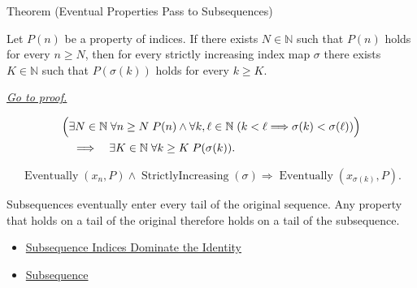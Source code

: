 
\begin{theorembox}{Theorem (Eventual Properties Pass to Subsequences)}
\begin{theorem}
\label{thm:eventual-properties-pass-to-subsequences}
Let $P(n)$ be a property of indices. If there exists $N\in\mathbb{N}$ such
that $P(n)$ holds for every $n\ge N$, then for every strictly increasing
index map $\sigma$ there exists $K\in\mathbb{N}$ such that $P(\sigma(k))$
holds for every $k\ge K$.

\smallskip
\noindent
\hyperref[prf:eventual-properties-pass-to-subsequences]{\textit{Go to proof.}}
\end{theorem}
\end{theorembox}

\begin{remark*}
\[
\begin{aligned}
&\Bigl(
  \exists N\in\mathbb{N}\;\forall n\ge N\;P(n)
  \land
  \forall k,\ell\in\mathbb{N}\;(k<\ell\Longrightarrow\sigma(k)<\sigma(\ell))
\Bigr)\\
&\quad\Longrightarrow\quad
\exists K\in\mathbb{N}\;\forall k\ge K\;P(\sigma(k)).
\end{aligned}
\]
\end{remark*}

\begin{remark*}
\[
\operatorname{Eventually}(x_n,P)
\land
\operatorname{StrictlyIncreasing}(\sigma)
\Longrightarrow
\operatorname{Eventually}(x_{\sigma(k)},P).
\]
\end{remark*}

\begin{remark*}[Interpretation]
Subsequences eventually enter every tail of the original sequence. Any
property that holds on a tail of the original therefore holds on a tail of
the subsequence.
\end{remark*}

\begin{dependencies}
\begin{itemize}
  \item \hyperref[thm:subsequence-indices-dominate-identity]{Subsequence Indices Dominate the Identity}
  \item \hyperref[def:subsequence]{Subsequence}
\end{itemize}
\end{dependencies}

